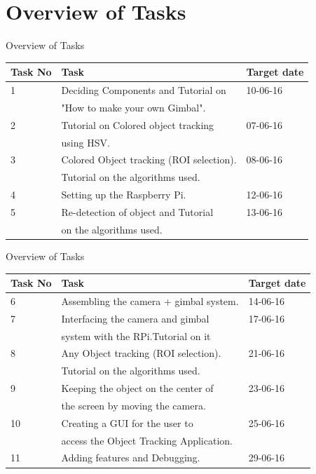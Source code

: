 \documentclass[10pt, a4paper]{beamer}
\begin{document}
\section{Overview of Tasks}
\begin{frame}{Overview of Tasks}
\begin{tabular}{|l|l|l|}
\hline
Task No & Task & Target date\\
\hline
1& Deciding Components and Tutorial on& 10-06-16\\  &"How to make your own Gimbal".& \\
\hline
2 & Tutorial on Colored object tracking& 07-06-16\\  & using HSV.& \\
\hline
3&Colored Object tracking (ROI selection).& 08-06-16\\  &Tutorial on the algorithms used.& \\
\hline
4&Setting up the Raspberry Pi.& 12-06-16\\
\hline
5&Re-detection of object and Tutorial& 13-06-16\\  & on the algorithms used.& \\
\hline
\end{tabular}
\end{frame}
\begin{frame}{Overview of Tasks}
\begin{tabular}{|l|l|l|}
\hline
Task No & Task & Target date\\
\hline
6&Assembling the camera + gimbal system.& 14-06-16\\ 
\hline
7 &Interfacing the camera and gimbal& 17-06-16\\ &system with the RPi.Tutorial on it& \\
\hline
8&Any Object tracking (ROI selection).& 21-06-16\\  &Tutorial on the algorithms used.& \\
\hline
9&Keeping the object on the center of& 23-06-16\\  &the screen by moving the camera.& \\
\hline
10&Creating a GUI for the user to & 25-06-16\\  & access the Object Tracking Application.& \\
\hline
11&Adding features and Debugging. & 29-06-16\\
\hline
\end{tabular}
\end{frame}
\end{document}
